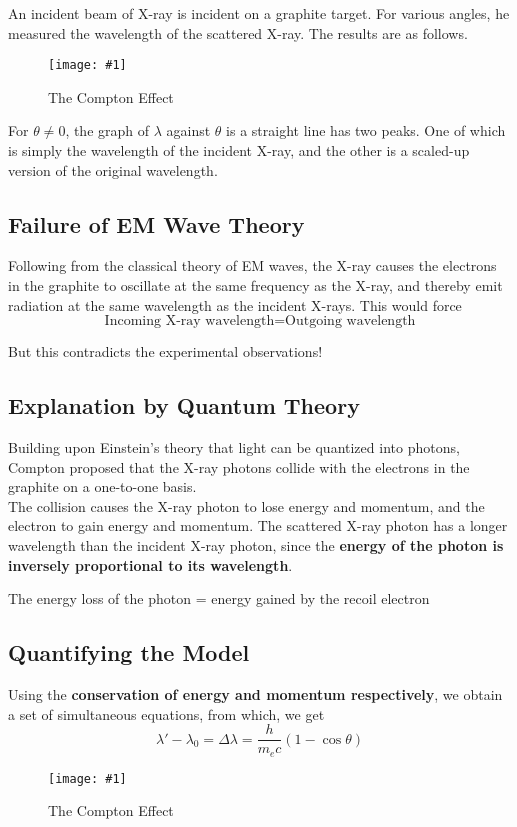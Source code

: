\documentclass[a4paper,12pt]{article}
\newcommand{\lb}{\\[8pt]}
\newcommand{\img}[4]{\begin{center}
  \begin{figure}[H]
    \centering
    \texttt{[image: \#1]}
    \caption{#3}
    \label{fig:#4}
  \end{figure}
\end{center}}
\begin{document}
An incident beam of X-ray is incident on a graphite target. For various angles, he measured the wavelength of the scattered X-ray. The results are as follows.

\img{compton.png}{1}{The Compton Effect}{compton}

For $\theta \not = 0$, the graph of $\lambda$ against $\theta$ is a straight line has two peaks. One of which is simply the wavelength of the incident X-ray, and the other is a scaled-up version of the original wavelength.

\pagebreak

\subsection{Failure of EM Wave Theory}

Following from the classical theory of EM waves, the X-ray causes the electrons in the graphite to oscillate at the same frequency as the X-ray, and thereby emit radiation at the same wavelength as the incident X-rays. This would force $$\text{Incoming X-ray wavelength} = \text{Outgoing wavelength}$$

But this contradicts the experimental observations!

\subsection{Explanation by Quantum Theory}

Building upon Einstein's theory that light can be quantized into photons, Compton proposed that the X-ray photons collide with the electrons in the graphite on a one-to-one basis. \lb
The collision causes the X-ray photon to lose energy and momentum, and the electron to gain energy and momentum. The scattered X-ray photon has a longer wavelength than the incident X-ray photon, since the \textbf{energy of the photon is inversely proportional to its wavelength}.\lb
\begin{center}
  The energy loss of the photon = energy gained by the recoil electron
\end{center}


\subsection{Quantifying the Model}

Using the \textbf{conservation of energy and momentum respectively}, we obtain a set of simultaneous equations, from which, we get \begin{equation}\label{eq:compton_wavelength_change}
  \lambda' - \lambda_0  = \Delta \lambda = \frac{h}{m_ec}(1-\cos \theta)
\end{equation}
\img{compton2.png}{0.9}{The Compton Effect}{compton2}
\end{document}
